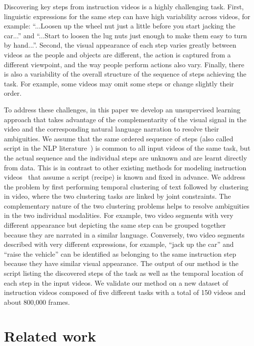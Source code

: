 \documentclass[10pt,twocolumn,letterpaper]{article}
\begin{document}
Discovering key steps from instruction videos is a highly challenging task.
%
%
%
First, linguistic expressions for the same step can have high variability across videos, for example: ``...Loosen up the wheel nut just a little before you start jacking the car...'' and ``...Start to loosen the lug nuts just enough to make them easy to turn by hand...''.
Second, the visual appearance of each step varies greatly between videos as the people and objects are different, the action is captured from a different viewpoint, and the way people perform actions also vary.
Finally, there is also a variability of the overall structure of the sequence of steps achieving the task. For example, 
some videos may omit some steps or change slightly their order.

To address these challenges, in this paper we develop an unsupervised learning approach that takes advantage of the complementarity of the 
visual signal in the video and the corresponding natural language narration to resolve their ambiguities. 
%
We assume that the same ordered sequence of steps (also called script in the NLP literature~\cite{Regneri10learning}) is common to all input videos of the same task, but the actual sequence and the individual steps are unknown and are learnt directly from data. 
This is in contrast to other existing methods for modeling instruction videos~\cite{Malmaud15what} that assume a script (recipe) is known and fixed in advance. 
We address the problem by first performing temporal clustering of text followed by clustering in video, where the two clustering tasks are linked by joint constraints. 
The complementary nature of the two clustering problems helps to resolve ambiguities in the two individual modalities. For example, two video segments with very different appearance but depicting the same step can be grouped together  because they are narrated in a similar language.
Conversely, two video segments described with very different expressions, for example, ``jack up the car'' and ``raise the vehicle'' can be identified as belonging to the same instruction step because they have similar visual appearance.
The output of our method is the script listing the discovered steps of the task as well as the temporal location of each step in the input videos. 
We validate our method on a new dataset of instruction videos composed of five different tasks with a total of 150 videos and about 800,000 frames.

%
%
%
%
%
%
%

%

\section{Related work}
\end{document}
